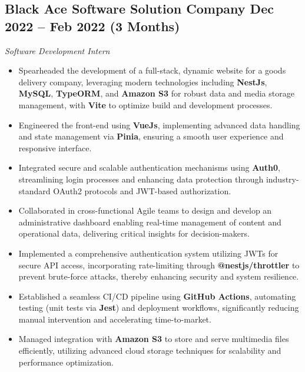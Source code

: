 \documentclass[a4paper,10pt]{article}
\begin{document}
\subsection*{Black Ace Software Solution Company \hfill Dec 2022 – Feb 2022 (3 Months)}
\textit{Software Development Intern}
\begin{itemize}
    \item Spearheaded the development of a full-stack, dynamic website for a goods delivery company, leveraging modern technologies including \textbf{NestJs}, \textbf{MySQL}, \textbf{TypeORM}, and \textbf{Amazon S3} for robust data and media storage management, with \textbf{Vite} to optimize build and development processes.
    \item Engineered the front-end using \textbf{VueJs}, implementing advanced data handling and state management via \textbf{Pinia}, ensuring a smooth user experience and responsive interface.
    \item Integrated secure and scalable authentication mechanisms using \textbf{Auth0}, streamlining login processes and enhancing data protection through industry-standard OAuth2 protocols and JWT-based authorization.
    \item Collaborated in cross-functional Agile teams to design and develop an administrative dashboard enabling real-time management of content and operational data, delivering critical insights for decision-makers.
    \item Implemented a comprehensive authentication system utilizing JWTs for secure API access, incorporating rate-limiting through \textbf{@nestjs/throttler} to prevent brute-force attacks, thereby enhancing security and system resilience.
    \item Established a seamless CI/CD pipeline using \textbf{GitHub Actions}, automating testing (unit tests via \textbf{Jest}) and deployment workflows, significantly reducing manual intervention and accelerating time-to-market.
    \item Managed integration with \textbf{Amazon S3} to store and serve multimedia files efficiently, utilizing advanced cloud storage techniques for scalability and performance optimization.
\end{itemize}
\end{document}
